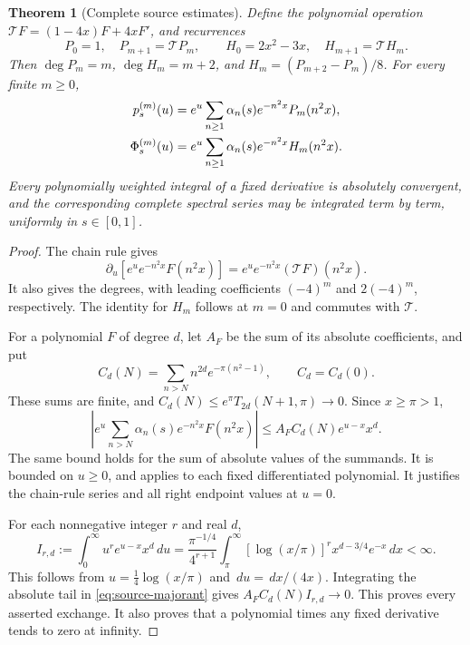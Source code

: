 \documentclass[11pt,letterpaper]{article}
\numberwithin{equation}{section}
\newtheorem{theorem}{Theorem}[section]
\theoremstyle{remark}
\newcommand{\dd}{\,d}
\begin{document}
\begin{theorem}[Complete source estimates]\label{thm:source}
Define the polynomial operation
\(\mathcal T F=(1-4x)F+4xF'\), and recurrences
\begin{equation}
 P_0=1,\quad P_{m+1}=\mathcal T P_m,\qquad
 H_0=2x^2-3x,\quad H_{m+1}=\mathcal T H_m.
 \label{eq:recurrences}
\end{equation}
Then \(\deg P_m=m\), \(\deg H_m=m+2\), and
\(H_m=(P_{m+2}-P_m)/8\). For every finite \(m\ge0\),
\begin{align}
 p_s^{(m)}(u)&=e^u\sum_{n\ge1}\alpha_n(s)e^{-n^2x}P_m(n^2x),\notag\\
 \Phi_s^{(m)}(u)&=e^u\sum_{n\ge1}\alpha_n(s)e^{-n^2x}H_m(n^2x).
 \label{eq:source-derivatives}
\end{align}
Every polynomially weighted integral of a fixed derivative is
absolutely convergent, and the corresponding complete spectral
series may be integrated term by term, uniformly in \(s\in[0,1]\).
\end{theorem}
\begin{proof}
The chain rule gives
\[
 \partial_u[e^ue^{-n^2x}F(n^2x)]
 =e^ue^{-n^2x}(\mathcal T F)(n^2x).
\]
It also gives the degrees, with leading coefficients
\((-4)^m\) and \(2(-4)^m\), respectively. The identity for \(H_m\)
follows at \(m=0\) and commutes with \(\mathcal T\).

For a polynomial \(F\) of degree \(d\), let \(A_F\) be the sum of
its absolute coefficients, and put
\[
 C_d(N)=\sum_{n>N}n^{2d}e^{-\pi(n^2-1)},\qquad C_d=C_d(0).
\]
These sums are finite, and
\(C_d(N)\le e^\pi T_{2d}(N+1,\pi)\to0\).
Since \(x\ge\pi>1\),
\begin{equation}
 \left|e^u\sum_{n>N}\alpha_n(s)e^{-n^2x}F(n^2x)\right|
 \le A_F C_d(N)e^{u-x}x^d. \label{eq:source-majorant}
\end{equation}
The same bound holds for the sum of absolute values of the summands.
It is bounded on \(u\ge0\), and applies to each fixed differentiated
polynomial. It justifies the chain-rule series and all right endpoint
values at \(u=0\).

For each nonnegative integer \(r\) and real \(d\),
\begin{equation}
 I_{r,d}:=\int_0^\infty u^r e^{u-x}x^d\dd u
 =\frac{\pi^{-1/4}}{4^{r+1}}\int_\pi^\infty
 [\log(x/\pi)]^r x^{d-3/4}e^{-x}\dd x<\infty.
 \label{eq:integrable-majorant}
\end{equation}
This follows from \(u=\frac14\log(x/\pi)\) and
\(\dd u=\dd x/(4x)\). Integrating the absolute tail in
\eqref{eq:source-majorant} gives
\(A_F C_d(N)I_{r,d}\to0\).
This proves every asserted exchange. It also proves that a polynomial
times any fixed derivative tends to zero at infinity.
\end{proof}
\end{document}
